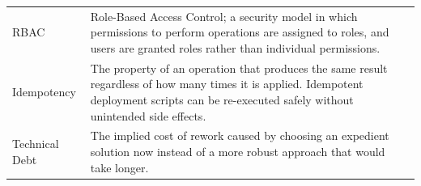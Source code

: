\begin{longtable}{l p{10cm}}
  RBAC                    & Role-Based Access Control; a security model in which permissions to perform operations are assigned to roles, and users are granted roles rather than individual permissions. \\[6pt]
  Idempotency             & The property of an operation that produces the same result regardless of how many times it is applied. Idempotent deployment scripts can be re-executed safely without unintended side effects. \\[6pt]
  Technical Debt          & The implied cost of rework caused by choosing an expedient solution now instead of a more robust approach that would take longer. \\
\end{longtable}
